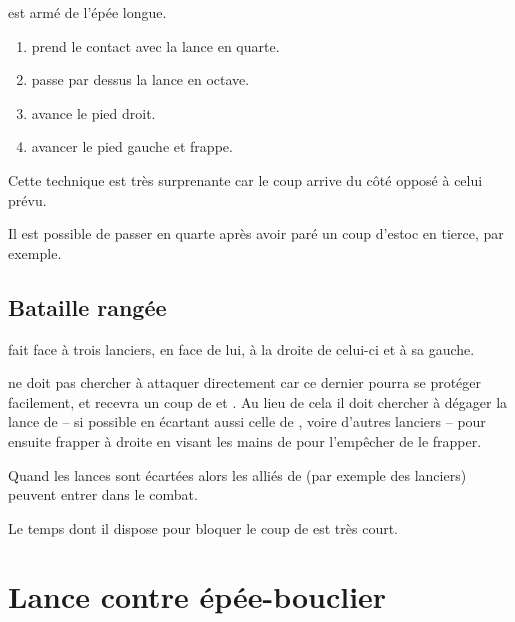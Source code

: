 \begin{technique}

\A est armé de l'épée longue.

\begin{enumerate}
	\item \A prend le contact avec la lance en quarte.
	
	\item \A passe par dessus la lance en octave.
	
	\item \A avance le pied droit.
	
	\item \A avancer le pied gauche et frappe.
\end{enumerate}

Cette technique est très surprenante car le coup arrive du côté opposé à celui prévu.

Il est possible de passer en quarte après avoir paré un coup d'estoc en tierce, par exemple.

\end{technique}


\subsection{Bataille rangée}


\begin{technique}

\A fait face à trois lanciers,  en face de lui,  à la droite de celui-ci et  à sa gauche.

\A ne doit pas chercher à attaquer directement  car ce dernier pourra se protéger facilement, et \A recevra un coup de  et .
Au lieu de cela il doit chercher à dégager la lance de  – si possible en écartant aussi celle de , voire d'autres lanciers – pour ensuite frapper à droite en visant les mains de  pour l'empêcher de le frapper.

Quand les lances sont écartées alors les alliés de \A (par exemple des lanciers) peuvent entrer dans le combat.

Le temps dont il dispose pour bloquer le coup de  est très court.

\end{technique}



\section{Lance contre épée-bouclier}


